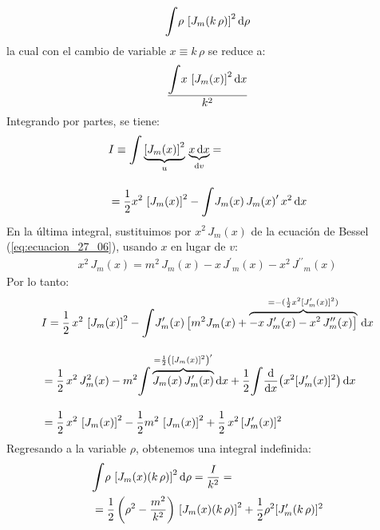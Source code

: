 \documentclass[12pt]{article}
\newcommand{\pderivada}[1]{\ensuremath{{#1}^{\prime}}}
\newcommand{\sderivada}[1]{\ensuremath{{#1}^{\prime \prime}}}
\def\scaleint#1{\vcenter{\hbox{\scaleto[3ex]{\displaystyle\int}{#1}}}}
\numberwithin{equation}{section}
\begin{document}
\begin{align*}
\displaystyle \scaleint{6ex} \rho \, \left[ J_{m} ( k \, \rho) \right]^{2} \dd{\rho}
\end{align*}
la cual con el cambio de variable $x \equiv k \, \rho$ se reduce a:
\begin{align*}
\dfrac{\displaystyle \scaleint{6ex} x \, \left[ J_{m} (x) \right]^{2} \dd{x}}{k^{2}}
\end{align*}
Integrando por partes, se tiene:
\begin{align*}
&I \equiv \scaleint{6ex}  \underbrace{ \left[ J_{m} (x) \right]^{2} }_{u} \, \underbrace{x \dd{x}}_{\dd{v}} = \\[1em] 
&= \dfrac{1}{2} x^{2} \, \left[ J_{m} (x) \right]^{2} - \scaleint{6ex} J_{m} (x) \, \pderivada{ J_{m} (x)} \, x^{2} \dd{x}
\end{align*}
En la última integral, sustituimos por $x^{2} \, J_{m} (x)$ de la ecuación de Bessel (\ref{eq:ecuacion_27_06}), usando $x$ en lugar de $v$:
\begin{align*}
x^{2} \, J_{m} (x) =  m^{2} \, J_{m}(x) - x \, \pderivada{J}_{m} (x) - x^{2} \, \sderivada{J}_{m} (x)
\end{align*}
Por lo tanto:
\begin{align*}
&I = \dfrac{1}{2} \, x^{2} \, \left[ J_{m} (x) \right]^{2} - \scaleint{6ex} \pderivada{J}_{m}(x) \, \big[ m^{2} J_{m} (x) + \overbrace{- x \, \pderivada{J}_{m} (x) - x^{2} \, \sderivada{J}_{m} (x) \big ]}^{=-(\frac{1}{2} x^{2} [\pderivada{J}_{m} (x)]^{2})} \, \dd{x} \\[1em]
&= \dfrac{1}{2} \, x^{2} \, J_{m}^{2} (x) - m^{2} \scaleint{6ex} \overbrace{J_{m} (x) \, \pderivada{J}_{m} (x)}^{=\frac{1}{2} \left( \left[ J_{m} (x) \right]^{2}\right)^{\prime}} \dd{x} + \dfrac{1}{2} \scaleint{6ex} \dv{x} (x^{2} [\pderivada{J}_{m} (x)]^{2}) \dd{x} \\[1em]  
&= \dfrac{1}{2} \, x^{2} \, \left[J_{m} (x) \right]^{2} - \dfrac{1}{2} m^{2} \, \left[J_{m} (x) \right]^{2} + \dfrac{1}{2} \, x^{2} \, [\pderivada{J}_{m}(x)]^{2}
\end{align*}
Regresando a la variable $\rho$, obtenemos una integral indefinida:
\begin{eqnarray}
\begin{aligned}[b]
&\scaleint{6ex} \rho \, \left[J_{m} (x) ( k \, \rho) \right]^{2} \dd{\rho} =  \dfrac{I}{k^{2}} = \\
&= \dfrac{1}{2} \left(\rho^{2} - \dfrac{m^{2}}{k^{2}} \right) \, \left[J_{m} (x) ( k \, \rho) \right]^{2} + \dfrac{1}{2} \rho^{2} [\pderivada{J}_{m}(k \, \rho)]^{2}
\end{aligned}
\label{eq:ecuacion_27_21}
\end{eqnarray}
\end{document}
